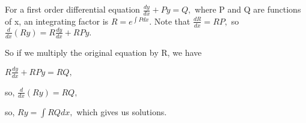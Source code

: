  For a first order differential equation $ \frac{dy}{dx} + Py = Q , $
where P and Q are functions of x, an integrating factor is 
$ R = e ^{\int P dx } . $ Note that $ \frac{dR}{dx} = RP , $
so $ \frac{d}{dx}(Ry) =  R \frac{dy}{dx} +RPy . $
\par
So if we multiply the original equation by R, we have
\par
$ R \frac{dy}{dx} + RPy = RQ , $
\par
so, $ \frac{d}{dx} (Ry) = RQ, $
\par
so, $ Ry = \int RQ dx , $ which gives us solutions.
